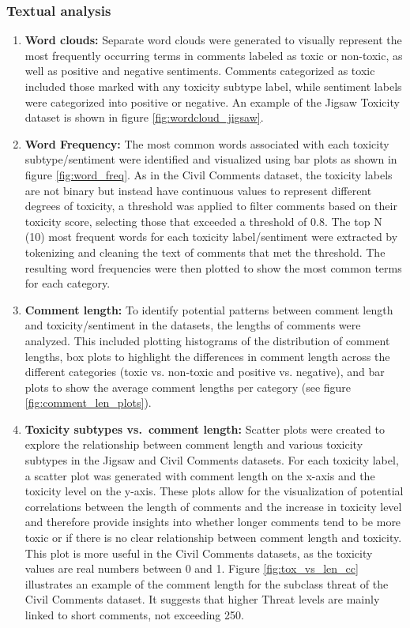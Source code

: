 \subsubsection{Textual analysis}
\begin{enumerate}
    \item \textbf{Word clouds:} Separate word clouds were generated to visually represent the most frequently occurring terms in comments labeled as toxic or non-toxic, as well as positive and negative sentiments. Comments categorized as toxic included those marked with any toxicity subtype label, while sentiment labels were categorized into positive or negative. An example of the Jigsaw Toxicity dataset is shown in figure \ref{fig:wordcloud_jigsaw}.
    \item \textbf{Word Frequency:} The most common words associated with each toxicity subtype/sentiment were identified and visualized using bar plots as shown in figure \ref{fig:word_freq}. As in the Civil Comments dataset, the toxicity labels are not binary but instead have continuous values to represent different degrees of toxicity, a threshold was applied to filter comments based on their toxicity score, selecting those that exceeded a threshold of 0.8. The top N (10) most frequent words for each toxicity label/sentiment were extracted by tokenizing and cleaning the text of comments that met the threshold. The resulting word frequencies were then plotted to show the most common terms for each category. 
    \item \textbf{Comment length:} To identify potential patterns between comment length and toxicity/sentiment in the datasets, the lengths of comments were analyzed. This included plotting histograms of the distribution of comment lengths, box plots to highlight the differences in comment length across the different categories (toxic vs. non-toxic and positive vs. negative), and bar plots to show the average comment lengths per category (see figure \ref{fig:comment_len_plots}). 
    \item \textbf{Toxicity subtypes vs.\ comment length:} Scatter plots were created to explore the relationship between comment length and various toxicity subtypes in the Jigsaw and Civil Comments datasets. For each toxicity label, a scatter plot was generated with comment length on the x-axis and the toxicity level on the y-axis. These plots allow for the visualization of potential correlations between the length of comments and the increase in toxicity level and therefore provide insights into whether longer comments tend to be more toxic or if there is no clear relationship between comment length and toxicity. This plot is more useful in the Civil Comments datasets, as the toxicity values are real numbers between 0 and 1. Figure \ref{fig:tox_vs_len_cc} illustrates an example of the comment length for the subclass threat of the Civil Comments dataset. It suggests that higher Threat levels are mainly linked to short comments, not exceeding 250. 
\end{enumerate}

